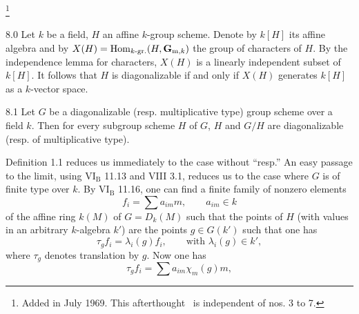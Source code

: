 \footnote{Added in July 1969. This afterthought \No\ is independent of nos. 3 to 7.}
\begin{scholium}{8.0}\label{IX.8.0}
 Let $k$ be a field, $H$ an affine $k$-group scheme. Denote by $k[H]$ its affine algebra and by $X(H)=\operatorname{Hom}_{k\text{-}\mathrm{gr.}}(H,\mathbf{G}_{\mathrm{m},k})$ the group of characters of $H$. By the independence lemma for characters, $X(H)$ is a linearly independent subset of $k[H]$. It follows that $H$ is diagonalizable if and only if $X(H)$ generates $k[H]$ as a $k$-vector space.
\end{scholium}
\begin{proposition}{8.1}\label{IX.8.1}
Let $G$ be a diagonalizable (resp. multiplicative type) group scheme over a field $k$. Then for every subgroup scheme $H$ of $G$, $H$ and $G/H$ are diagonalizable (resp. of multiplicative type).
\end{proposition}
Definition 1.1 reduces us immediately to the case without ``resp.'' An easy passage to the limit, using VI$_{\mathrm B}$ 11.13 and VIII 3.1, reduces us to the case where $G$ is of finite type over $k$. By VI$_{\mathrm B}$ 11.16, one can find a finite family of nonzero elements
\begin{equation}\tag{8.1.1}
f_i=\sum a_{im}m,\qquad a_{im}\in k
\end{equation}
of the affine ring $k(M)$ of $G=D_k(M)$ such that the points of $H$ (with values in an arbitrary $k$-algebra $k'$) are the points $g\in G(k')$ such that one has
\begin{equation}\tag{8.1.2}
\tau_g f_i=\lambda_i(g)f_i,\qquad\text{with }\lambda_i(g)\in k',
\end{equation}
where $\tau_g$ denotes translation by $g$. Now one has
\begin{equation}\tag{8.1.3}
\tau_g f_i=\sum a_{im}\chi_m(g)m,
\end{equation}
